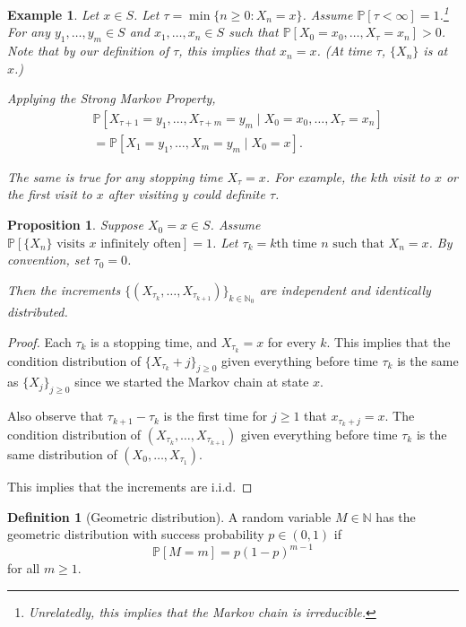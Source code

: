 \documentclass{tufte-handout}
\newcommand*\N{\mathbb{N}}
\renewcommand*\P{\mathbb{P}}
\newtheorem{ex}[thm]{Example}
\newtheorem{prop}[thm]{Proposition}
\theoremstyle{definition}
\newtheorem{defn}[thm]{Definition}
\begin{document}
\begin{ex}
	Let $x \in S$. Let $\tau = \min \{n \ge 0 : X_n = x\}$. Assume $\P\left[\tau < \infty\right] = 1$.\footnote{Unrelatedly, this implies that the Markov chain is irreducible.} For any $y_1,\ldots,y_m \in S$ and $x_1,\ldots,x_n \in S$ such that $\P\left[X_0 = x_0, \ldots,X_\tau = x_n\right] > 0$. Note that by our definition of $\tau$, this implies that $x_n= x$. (At time $\tau$, $\{X_n\}$ is at $x$.)

	Applying the Strong Markov Property, 
	\begin{align*}
		&\P\left[X_{\tau + 1} = y_1,\ldots,X_{\tau + m} = y_m\mid X_0 = x_0,\ldots,X_\tau = x_n\right] \\
		&= \P\left[X_1 = y_1, \ldots,X_m  = y_m \mid X_0 = x\right] 
	.\end{align*}

	The same is true for any stopping time $X_\tau = x$. For example, the $k$th visit to $x$ or the first visit to $x$ after visiting $y$ could definite $\tau$.
\end{ex}

\begin{prop}
	Suppose $X_0 = x \in S$. Assume $\P\left[\{X_n\} \text{ visits } x \text{ infinitely often}\right]  = 1$. Let $\tau_k = k\text{th time } n \text{ such that } X_n = x$. By convention, set $\tau_0 = 0$.

	Then the increments $\{\left( X_{\tau_k},\ldots,X_{\tau_{k+1}} \right)\}_{k \in \N_0}$ are independent and identically distributed. 
\end{prop}

\begin{proof}
	Each $\tau_k$ is a stopping time, and $X_{\tau_k} = x$ for every $k$. This implies that the condition distribution of $\{X_{\tau_k} + j\}_{j \ge 0}$ given everything before time $\tau_k$ is the same as $\{X_j\}_{j\ge 0}$ since we started the Markov chain at state $x$. 

	Also observe that $\tau_{k+1} - \tau_k$ is the first time for $j \ge 1$ that $x_{\tau_k + j} = x$. The condition distribution of $\left(X_{\tau_k},\ldots,X_{\tau_{k+1}}\right)$ given everything before time $\tau_k$ is the same distribution of $\left( X_0,\ldots,X_{\tau_1} \right)$.

	This implies that the increments are i.i.d.
\end{proof}

\begin{defn}[Geometric distribution]
	A random variable $M \in \N$ has the geometric distribution with success probability $p \in (0,1)$ if \[
		\P\left[M = m \right]  = p(1-p)^{m-1}
	\] for all $m \ge 1$.
\end{defn}
\end{document}

